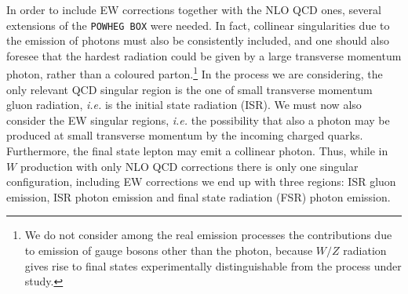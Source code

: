 \documentclass[11pt,a4paper]{article}
\newcommand\POWHEGBOX{\texttt{POWHEG BOX}}
\begin{document}
In order to include EW corrections together with the NLO QCD ones,
several extensions of the \POWHEGBOX{} were needed. In fact,
collinear singularities due to the emission of photons must also be
consistently included, and one should also foresee that the hardest
radiation could be given by a large transverse momentum
photon, rather than a coloured parton.\footnote{We do not
  consider among the real emission processes the
  contributions due to emission of gauge bosons other than the photon,
  because $W/Z$ radiation gives rise to final states experimentally
  distinguishable from the process under study.}
In the process we
are considering, the only relevant QCD singular region is the one of
small transverse momentum gluon radiation, {\it i.e.} is the initial state
radiation (ISR).
We must now also consider the EW singular regions, {\it i.e.} the
possibility that also a photon may be produced at small transverse
momentum by the incoming charged quarks. Furthermore, the final state 
lepton may emit a collinear photon. Thus, while in $W$ production
with only NLO QCD corrections there is only one singular
configuration, including EW corrections we end up with three regions:
ISR gluon emission, ISR photon emission and final state radiation
(FSR) photon emission. 
\end{document}
